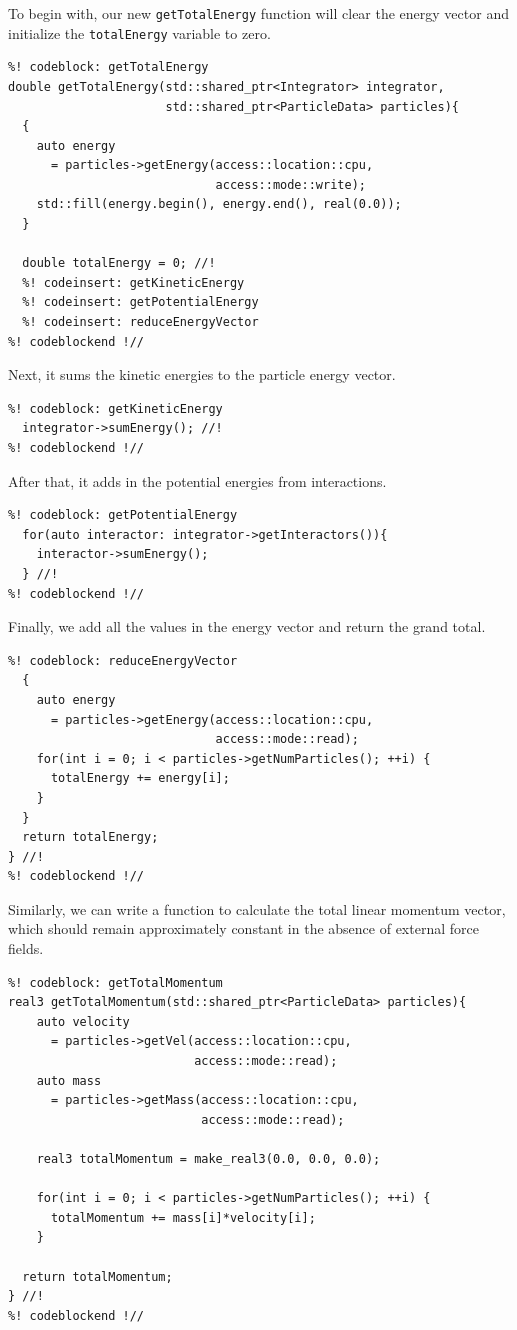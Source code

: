 To begin with, our new \texttt{getTotalEnergy} function will clear the energy 
vector and initialize the \texttt{totalEnergy} variable to zero.
\begin{lstlisting}
%! codeblock: getTotalEnergy
double getTotalEnergy(std::shared_ptr<Integrator> integrator,
                      std::shared_ptr<ParticleData> particles){
  {
    auto energy
      = particles->getEnergy(access::location::cpu,
                             access::mode::write);
    std::fill(energy.begin(), energy.end(), real(0.0));
  }

  double totalEnergy = 0; //!
  %! codeinsert: getKineticEnergy
  %! codeinsert: getPotentialEnergy
  %! codeinsert: reduceEnergyVector
%! codeblockend !//
\end{lstlisting}
Next, it sums the kinetic energies to the particle energy vector.
\begin{lstlisting}
%! codeblock: getKineticEnergy
  integrator->sumEnergy(); //!
%! codeblockend !//
\end{lstlisting}
After that, it adds in the potential energies from interactions.
\begin{lstlisting}
%! codeblock: getPotentialEnergy
  for(auto interactor: integrator->getInteractors()){
    interactor->sumEnergy();
  } //!
%! codeblockend !//
\end{lstlisting}
Finally, we add all the values in the energy vector and return the grand total.
\begin{lstlisting}
%! codeblock: reduceEnergyVector
  {
    auto energy
      = particles->getEnergy(access::location::cpu,
                             access::mode::read);
    for(int i = 0; i < particles->getNumParticles(); ++i) {
      totalEnergy += energy[i];
    }
  }
  return totalEnergy;
} //!
%! codeblockend !//
\end{lstlisting}

Similarly, we can write a function to calculate the total linear momentum 
vector, which should remain approximately constant in the absence of external 
force fields.

\begin{lstlisting}
%! codeblock: getTotalMomentum
real3 getTotalMomentum(std::shared_ptr<ParticleData> particles){
    auto velocity
      = particles->getVel(access::location::cpu,
                          access::mode::read);
    auto mass
      = particles->getMass(access::location::cpu,
                           access::mode::read);

    real3 totalMomentum = make_real3(0.0, 0.0, 0.0);

    for(int i = 0; i < particles->getNumParticles(); ++i) {
      totalMomentum += mass[i]*velocity[i];
    }

  return totalMomentum;
} //!
%! codeblockend !//
\end{lstlisting}

